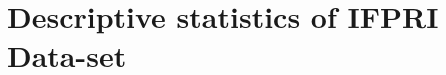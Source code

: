 \documentclass[12pt,letterpaper]{article}\usepackage[margin=1in]{geometry}
\newcommand{\0}{\ensuremath{\mbox{\boldmath $0$}}}
\begin{document}


\pagebreak

\section{Descriptive statistics of IFPRI Data-set\label{app_a3}}
\end{document}
